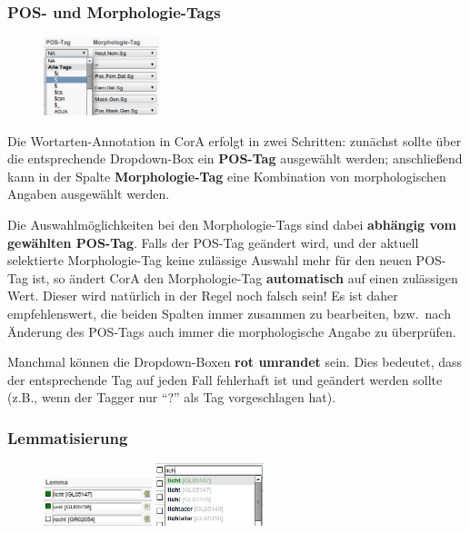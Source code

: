\documentclass[11pt,a4paper,parskip=half]{scrartcl}
\begin{document}
\subsubsection{POS- und Morphologie-Tags}

\begin{figure}
  \begin{center}\vspace{-2em}
    \includegraphics[width=0.3\textwidth]{img/pos.png}
  \end{center}
\end{figure}

Die Wortarten-Annotation in CorA erfolgt in zwei Schritten: zunächst
sollte über die entsprechende Dropdown-Box ein \textbf{POS-Tag}
ausgewählt werden; anschließend kann in der Spalte
\textbf{Morphologie-Tag} eine Kombination von morphologischen Angaben
ausgewählt werden.

Die Auswahlmöglichkeiten bei den Morphologie-Tags sind dabei
\textbf{abhängig vom gewählten POS-Tag}.  Falls der POS-Tag geändert
wird, und der aktuell selektierte Morphologie-Tag keine zulässige
Auswahl mehr für den neuen POS-Tag ist, so ändert CorA den
Morphologie-Tag \textbf{automatisch} auf einen zulässigen Wert.
Dieser wird natürlich in der Regel noch falsch sein!  Es ist daher
empfehlenswert, die beiden Spalten immer zusammen zu bearbeiten, bzw.\
nach Änderung des POS-Tags auch immer die morphologische Angabe zu
überprüfen.

Manchmal können die Dropdown-Boxen \textbf{rot umrandet} sein.  Dies
bedeutet, dass der entsprechende Tag auf jeden Fall fehlerhaft ist und
geändert werden sollte (z.B., wenn der Tagger nur "`?"' als Tag
vorgeschlagen hat).

\newpage %
\subsubsection{Lemmatisierung}

\begin{figure}\vspace{-2em}
  \begin{center}
    \includegraphics[width=0.28\textwidth]{img/lemma.png}\vspace{20px}
    \includegraphics[width=0.28\textwidth]{img/lemma-edit.png}
  \end{center}
\end{figure}
\end{document}
